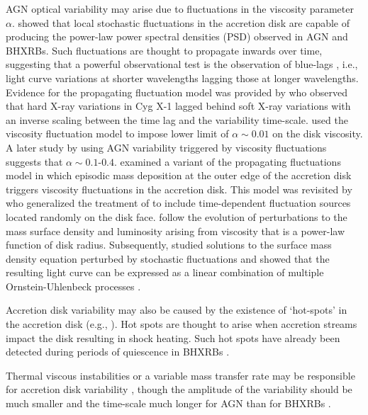 \documentclass[a4paper,fleqn,usenatbib]{mnras}
\begin{document}
AGN optical variability may arise due to fluctuations in the \citet{ShakuraSunyaev73} viscosity parameter $\alpha$. \citet{Lyubarskii97} showed that local stochastic fluctuations in the accretion disk are capable of producing the power-law power spectral densities (PSD) observed in AGN and BHXRBs. Such fluctuations are thought to propagate inwards over time, suggesting that a powerful observational test is the observation of blue-lags \citep{UttleyAccretion}, i.e., light curve variations at shorter wavelengths lagging those at longer wavelengths. Evidence for the propagating fluctuation model was provided by \citet{Miyamoto88} who observed that hard X-ray variations in Cyg X-1 lagged behind soft X-ray variations with an inverse scaling between the time lag and the variability time-scale. \citet{Starling04} used the viscosity fluctuation model to impose lower limit of $\alpha \sim 0.01$ on the disk viscosity. A later study by \citet{King07} using AGN variability triggered by viscosity fluctuations suggests that $\alpha \sim 0.1$-$0.4$. \citet{Wood01} examined a variant of the \citet{Lyubarskii97} propagating fluctuations model in which episodic mass deposition at the outer edge of the accretion disk triggers viscosity fluctuations in the accretion disk. This model was revisited by \citet{Titarchuk07} who generalized the treatment of \citet{Wood01} to include time-dependent fluctuation sources located randomly on the disk face. \citet{Titarchuk07} follow the evolution of perturbations to the mass surface density and luminosity arising from viscosity that is a power-law function of disk radius. Subsequently, \citet{Kelly11} studied solutions to the surface mass density equation perturbed by stochastic fluctuations and showed that the resulting light curve can be expressed as a linear combination of multiple Ornstein-Uhlenbeck processes \citep{Gillespie96,Kelly09}.

Accretion disk variability may also be caused by the existence of `hot-spots' in the accretion disk (e.g., \citealt{MaccaroneAccretion}). Hot spots are thought to arise when accretion streams impact the disk resulting in shock heating. Such hot spots have already been detected during periods of quiescence in BHXRBs \citep{Froning11,McClintock95}.

Thermal viscous instabilities or a variable mass transfer rate may be responsible for accretion disk variability \citep{Lasota01,Coriat12}, though the amplitude of the variability should be much smaller and the time-scale much longer for AGN than for BHXRBs \citep{Hameury09}.
\end{document}
